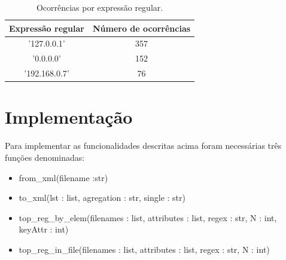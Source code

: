 \documentclass[11pt,a4paper]{report}%
\begin{document}
\begin{table}[h!] %
\begin{center} %
\begin{tabular}{ | c | c | } %
  \hline  %
  Expressão regular &  Número de ocorrências \\
  \hline
  '127.0.0.1'  & 357 \\
  '0.0.0.0' & 152 \\
  '192.168.0.7' & 76 \\
  \hline
\end{tabular}
\end{center}
\caption{Ocorrências por expressão regular.} \label{tab:tabelaBasica}
\end{table}

\section{Implementação}

Para implementar as funcionalidades descritas acima foram necessárias três funções denominadas:
\begin{itemize}
    \item from\_xml(filename :str)
    \item to\_xml(lst : list, agregation : str, single : str)
    \item top\_reg\_by\_elem(filenames : list, attributes : list, regex : str, N : int, keyAttr : int)
    \item top\_reg\_in\_file(filenames : list, attributes : list, regex : str, N : int)
\end{itemize}{}
\end{document}
